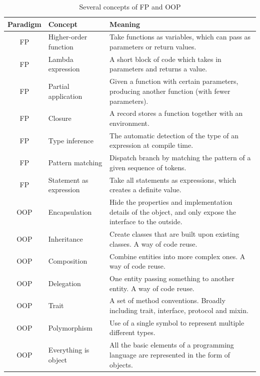 \begin{table}[htbp]
    \caption{Several concepts of FP and OOP}
    \label{tab:concept}
    \begin{center}
        \begin{tabular}{cll}
            \toprule
            Paradigm & Concept & Meaning \\
            \midrule
            FP & Higher-order function & Take functions as variables, which can
            pass as parameters or return values. \\
            FP & Lambda expression & A short block of code which takes in parameters
            and returns a value. \\
            FP & Partial application & Given a function with certain parameters,
            producing another function (with fewer parameters). \\
            FP & Closure & A record stores a function together with an
            environment\cite{sussman1998scheme}. \\
            FP & Type inference & The automatic detection of the type of an
            expression at compile time. \\
            FP & Pattern matching & Dispatch branch by matching the pattern of a
            given sequence of tokens. \\
            FP & Statement as expression & Take all statements as expressions, which
            creates a definite value. \\
            OOP & Encapsulation & Hide the properties and implementation details of
            the object, and only expose the interface to the outside. \\
            OOP & Inheritance & Create classes that are built upon existing
            classes\cite{johnson1988designing}. A way of
            code reuse. \\
            OOP & Composition & Combine entities into more complex ones. A way of
            code reuse. \\
            OOP & Delegation & One entity passing something to another
            entity\cite{wilkinson2009grid}. A way of code
            reuse. \\
            OOP & Trait & A set of method conventions. Broadly including trait,
            interface, protocol and mixin. \\
            OOP & Polymorphism & Use of a single symbol to represent multiple
            different
            types\cite{cardelli1985understanding}. \\
            OOP & Everything is object & All the basic elements of a programming
            language are represented in the form of objects. \\
            \bottomrule
        \end{tabular}
    \end{center}
\end{table}

